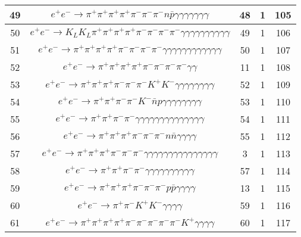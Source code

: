 \documentclass[landscape]{article}
\begin{document}
\begin{table}[htbp!]
\begin{tabular}{|c|c|c|c|c|}
\hline
49 & $ e^{+} e^{-} \rightarrow \pi^{+} \pi^{+} \pi^{+} \pi^{+} \pi^{-} \pi^{-} \pi^{-} n \bar{p} \gamma \gamma \gamma \gamma \gamma \gamma \gamma $ & 48 & 1 & 105 \\
\hline
50 & $ e^{+} e^{-} \rightarrow K_{L} K_{L} \pi^{+} \pi^{+} \pi^{+} \pi^{+} \pi^{-} \pi^{-} \pi^{-} \pi^{-} \gamma \gamma \gamma \gamma \gamma \gamma \gamma \gamma \gamma \gamma $ & 49 & 1 & 106 \\
\hline
51 & $ e^{+} e^{-} \rightarrow \pi^{+} \pi^{+} \pi^{+} \pi^{+} \pi^{-} \pi^{-} \pi^{-} \pi^{-} \gamma \gamma \gamma \gamma \gamma \gamma \gamma \gamma \gamma \gamma \gamma \gamma $ & 50 & 1 & 107 \\
\hline
52 & $ e^{+} e^{-} \rightarrow \pi^{+} \pi^{+} \pi^{+} \pi^{+} \pi^{-} \pi^{-} \pi^{-} \pi^{-} \gamma \gamma $ & 11 & 1 & 108 \\
\hline
53 & $ e^{+} e^{-} \rightarrow \pi^{+} \pi^{+} \pi^{+} \pi^{-} \pi^{-} \pi^{-} K^{+} K^{-} \gamma \gamma \gamma \gamma \gamma \gamma \gamma \gamma $ & 52 & 1 & 109 \\
\hline
54 & $ e^{+} e^{-} \rightarrow \pi^{+} \pi^{+} \pi^{-} \pi^{-} K^{-} \bar{n} p \gamma \gamma \gamma \gamma \gamma \gamma \gamma \gamma $ & 53 & 1 & 110 \\
\hline
55 & $ e^{+} e^{-} \rightarrow \pi^{+} \pi^{+} \pi^{-} \pi^{-} \gamma \gamma \gamma \gamma \gamma \gamma \gamma \gamma \gamma \gamma \gamma \gamma \gamma \gamma $ & 54 & 1 & 111 \\
\hline
56 & $ e^{+} e^{-} \rightarrow \pi^{+} \pi^{+} \pi^{+} \pi^{-} \pi^{-} \pi^{-} n \bar{n} \gamma \gamma \gamma \gamma $ & 55 & 1 & 112 \\
\hline
57 & $ e^{+} e^{-} \rightarrow \pi^{+} \pi^{+} \pi^{+} \pi^{-} \pi^{-} \pi^{-} \gamma \gamma \gamma \gamma \gamma \gamma \gamma \gamma \gamma \gamma \gamma \gamma \gamma \gamma \gamma $ & 3 & 1 & 113 \\
\hline
58 & $ e^{+} e^{-} \rightarrow \pi^{+} \pi^{+} \pi^{-} \pi^{-} \gamma \gamma \gamma \gamma \gamma \gamma \gamma \gamma \gamma \gamma $ & 57 & 1 & 114 \\
\hline
59 & $ e^{+} e^{-} \rightarrow \pi^{+} \pi^{+} \pi^{+} \pi^{-} \pi^{-} \pi^{-} p \bar{p} \gamma \gamma \gamma \gamma $ & 13 & 1 & 115 \\
\hline
60 & $ e^{+} e^{-} \rightarrow \pi^{+} \pi^{-} K^{+} K^{-} \gamma \gamma \gamma \gamma $ & 59 & 1 & 116 \\
\hline
61 & $ e^{+} e^{-} \rightarrow \pi^{+} \pi^{+} \pi^{+} \pi^{+} \pi^{-} \pi^{-} \pi^{-} \pi^{-} \pi^{-} K^{+} \gamma \gamma \gamma \gamma $ & 60 & 1 & 117 \\

\end{tabular}
\end{table}
\end{document}
